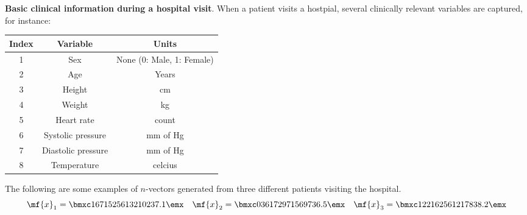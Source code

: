 \begin{boxedstuff}
    \begin{example}
        \textbf{Basic clinical information during a hospital visit}. When a patient visits a hostpial, several clinically relevant variables are captured, for instance:
        \begin{small}
            \begin{center}
            \begin{tabular}{ccc}
                \hline
                \textbf{Index} & \textbf{Variable} & \textbf{Units} \\ \hline
                1 & Sex & None (0: Male, 1: Female) \\
                2 & Age & Years \\
                3 & Height & cm \\
                4 & Weight & kg \\
                5 & Heart rate & count \\
                6 & Systolic pressure & mm of Hg \\
                7 & Diastolic pressure & mm of Hg \\
                8 & Temperature & celcius \\ \hline
            \end{tabular}
            \end{center}
        \end{small}
        The following are some examples of $n$-vectors generated from three different patients visiting the hospital.
        \begin{equation*}
            \mf{x}_1 = \bmxc 1 \\ 67 \\ 152 \\ 56 \\ 132 \\ 102 \\ 37.1 \emx \quad \mf{x}_2 = \bmxc 0 \\ 36 \\ 172 \\ 97 \\ 156 \\ 97 \\ 36.5 \emx \quad \mf{x}_3 = \bmxc 1 \\ 22 \\ 162 \\ 56 \\ 121 \\ 78 \\ 38.2 \emx
        \end{equation*}
    \end{example}


\end{boxedstuff}
